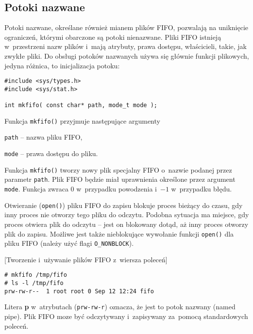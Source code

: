 \subsection{Potoki nazwane}
\label{sec:XPNJV}

Potoki nazwane, określane również mianem plików FIFO, pozwalają na uniknięcie
ograniczeń, którymi obarczone są potoki nienazwane. Pliki FIFO istnieją
w~przestrzeni nazw plików i~mają atrybuty, prawa dostępu, właścicieli, takie,
jak zwykłe pliki. Do obsługi potoków nazwanych używa się głównie funkcji
plikowych, jedyna różnica, to inicjalizacja potoku:
\begin{lstlisting}[style=MyCStyle]
#include <sys/types.h>
#include <sys/stat.h>

int mkfifo( const char* path, mode_t mode );
\end{lstlisting}
Funkcja \texttt{mkfifo()} przyjmuje następujące argumenty
\begin{myitemize}
  \item \texttt{path} -- nazwa pliku FIFO,
  \item \texttt{mode} -- prawa dostępu do pliku.
\end{myitemize}
Funkcja \texttt{mkfifo()} tworzy nowy plik specjalny FIFO o~nazwie podanej
przez parametr \texttt{path}. Plik FIFO będzie miał uprawnienia określone przez
argument \texttt{mode}. Funkcja zwraca $0$ w~przypadku powodzenia i~$-1$
w~przypadku błędu.

Otwieranie (\texttt{open()}) pliku FIFO do zapisu blokuje proces bieżący do
czasu, gdy inny proces nie otworzy tego pliku do odczytu. Podobna sytuacja ma
miejsce, gdy proces otwiera plik do odczytu -- jest on blokowany dotąd, aż inny
proces otworzy plik do zapisu. Możliwe jest także nieblokujące wywołanie
funkcji \texttt{open()} dla pliku FIFO (należy użyć flagi \texttt{O\_NONBLOCK}).

\begin{example}{[Tworzenie i~używanie plików FIFO z~wiersza poleceń]}
\begin{lstlisting}[style=MyBashStyle]
# mkfifo /tmp/fifo
# ls -l /tmp/fifo
prw-rw-r--  1 root root 0 Sep 12 12:24 fifo
\end{lstlisting}
Litera \textbf{p} w~atrybutach (\texttt{prw-rw-r}) oznacza, że jest to potok
nazwany (named pipe). Plik FIFO moze być odczytywany i~zapisywany za~pomocą
standardowych poleceń.
\end{example}

